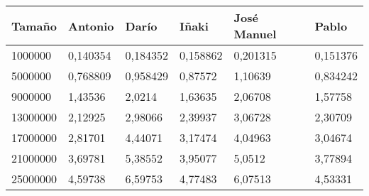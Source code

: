 \begin{tabular}{|l|l|l|l|l|l|}
	\hline
	Tamaño & Antonio & Darío & Iñaki & José Manuel & Pablo \\
	\hline
	\hline
	1000000 & 0,140354 & 0,184352 & 0,158862 & 0,201315 & 0,151376 \\
	\hline
	5000000 & 0,768809 & 0,958429 & 0,87572 & 1,10639 & 0,834242 \\
	\hline
	9000000 & 1,43536 & 2,0214 & 1,63635 & 2,06708 & 1,57758 \\
	\hline
	13000000 & 2,12925 & 2,98066 & 2,39937 & 3,06728 & 2,30709 \\
	\hline
	17000000 & 2,81701 & 4,44071 & 3,17474 & 4,04963 & 3,04674 \\
	\hline
	21000000 & 3,69781 & 5,38552 & 3,95077 & 5,0512 & 3,77894 \\
	\hline
	25000000 & 4,59738 & 6,59753 & 4,77483 & 6,07513 & 4,53331 \\
	\hline
\end{tabular}
